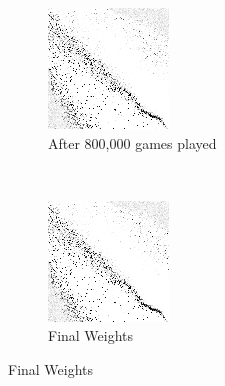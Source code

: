 \begin{figure}
	\begin{subfigure}[b]{0.4\textwidth}
	\includegraphics[width=\linewidth]{images/findings/round2/flipbook/winner/checkpoint_800000.png}
	\caption{After 800,000 games played}
	\end{subfigure}
	~
	\begin{subfigure}[b]{0.4\textwidth}
	\includegraphics[width=\linewidth]{images/findings/round2/flipbook/winner/checkpoint_999999.png}
	\caption{Final Weights}
	\end{subfigure}


\end{figure}
